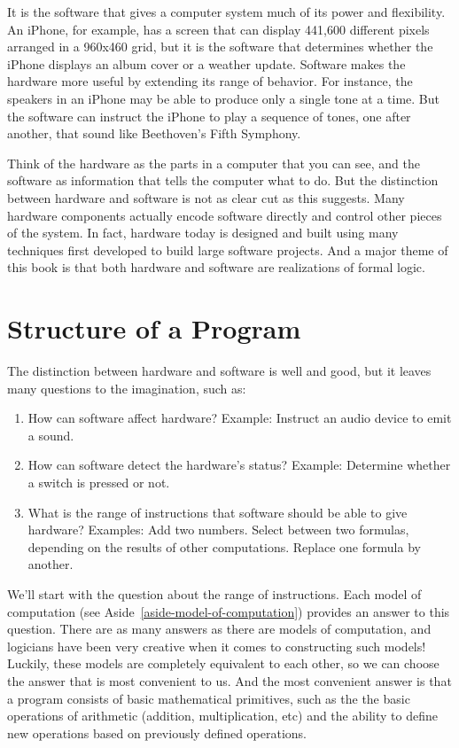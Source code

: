 It is the software that gives a computer system much of its power and
flexibility. An iPhone, for example, has a screen that
can display 441,600 different pixels arranged in a 960x460
grid, but it is the software that determines whether the
iPhone displays an album cover or a weather update.
Software makes the hardware more useful by extending its range of
behavior. For instance, the speakers in an iPhone may be able to produce
only a single tone at a time. But the software can instruct the iPhone to
play a sequence of tones, one after another, that sound like Beethoven's Fifth Symphony.

Think of the hardware as
the parts in a computer that you can see, and the software
as information that tells the computer what to do.
But the distinction between hardware and software is not as
clear cut as this suggests. Many hardware components actually
encode software directly and control other pieces of the system.
In fact, hardware today is designed and built using many techniques
first developed to build large software projects.  And a major theme
of this book is that both hardware and software are realizations of formal
logic.

\section{Structure of a Program}

The distinction between hardware and software is well and good,
but it leaves many questions to the imagination, such as:
\begin{enumerate}
\item How can software affect hardware? Example: Instruct an audio
        device to emit a sound.
\item How can software detect the hardware's status? Example:
        Determine whether a switch is pressed or not.
\item What is the range of instructions that software should be able to give hardware?
        Examples: Add two numbers. Select between two formulas, depending on the results of other computations. Replace one formula by another.
\end{enumerate}

We'll start with the question about the range of instructions.
Each model of computation (see Aside~\ref{aside-model-of-computation})
provides an answer to this question.
There are as many answers as there are
models of computation, and logicians have been very creative when it
comes to constructing such models!  Luckily, these models are
completely equivalent to each other, so we can choose the answer
that is most convenient to us.  And the most convenient answer is
that a program consists of basic mathematical primitives, such as
the the basic operations of arithmetic (addition, multiplication, etc)
and the ability to define new operations
based on previously defined operations.

